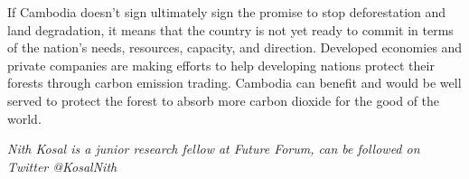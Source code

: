 \documentclass[10pt,a4paper]{letter}
\begin{document}
If Cambodia doesn't sign ultimately sign the promise to stop deforestation and land degradation, it means that the country is not yet ready to commit in terms of the nation's needs, resources, capacity, and direction. Developed economies and private companies are making efforts to help developing nations protect their forests through carbon emission trading. Cambodia can benefit and would be well served to protect the forest to absorb more carbon dioxide for the good of the world.


\textit{Nith Kosal is a junior research fellow at Future Forum, can be followed on Twitter @KosalNith}
\end{document}
